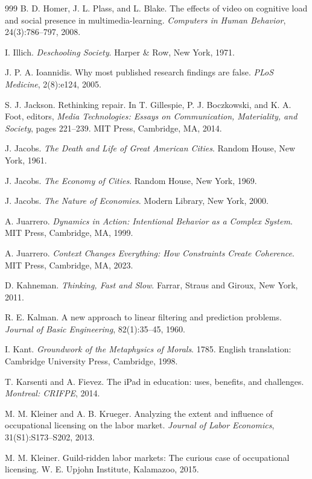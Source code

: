 \documentclass[11pt]{article}
\begin{document}
\begin{thebibliography}{999}
B. D. Homer, J. L. Plass, and L. Blake.
The effects of video on cognitive load and social presence in multimedia-learning.
\textit{Computers in Human Behavior}, 24(3):786--797, 2008.

I. Illich.
\textit{Deschooling Society}.
Harper \& Row, New York, 1971.

J. P. A. Ioannidis.
Why most published research findings are false.
\textit{PLoS Medicine}, 2(8):e124, 2005.

S. J. Jackson.
Rethinking repair.
In T. Gillespie, P. J. Boczkowski, and K. A. Foot, editors,
\textit{Media Technologies: Essays on Communication, Materiality, and Society}, pages 221--239.
MIT Press, Cambridge, MA, 2014.

J. Jacobs.
\textit{The Death and Life of Great American Cities}.
Random House, New York, 1961.

J. Jacobs.
\textit{The Economy of Cities}.
Random House, New York, 1969.

J. Jacobs.
\textit{The Nature of Economies}.
Modern Library, New York, 2000.

A. Juarrero.
\textit{Dynamics in Action: Intentional Behavior as a Complex System}.
MIT Press, Cambridge, MA, 1999.

A. Juarrero.
\textit{Context Changes Everything: How Constraints Create Coherence}.
MIT Press, Cambridge, MA, 2023.

D. Kahneman.
\textit{Thinking, Fast and Slow}.
Farrar, Straus and Giroux, New York, 2011.

R. E. Kalman.
A new approach to linear filtering and prediction problems.
\textit{Journal of Basic Engineering}, 82(1):35--45, 1960.

I. Kant.
\textit{Groundwork of the Metaphysics of Morals}.
1785. English translation: Cambridge University Press, Cambridge, 1998.

T. Karsenti and A. Fievez.
The iPad in education: uses, benefits, and challenges.
\textit{Montreal: CRIFPE}, 2014.

M. M. Kleiner and A. B. Krueger.
Analyzing the extent and influence of occupational licensing on the labor market.
\textit{Journal of Labor Economics}, 31(S1):S173--S202, 2013.

M. M. Kleiner.
Guild-ridden labor markets: The curious case of occupational licensing.
W. E. Upjohn Institute, Kalamazoo, 2015.


\end{thebibliography}
\end{document}

